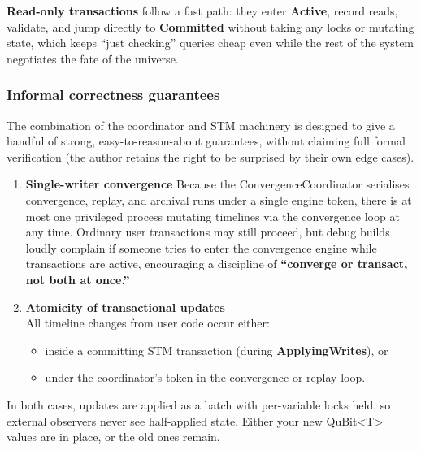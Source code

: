 \documentclass[a4paper,11pt]{article}
\begin{document}
\textbf{Read-only transactions} follow a fast path: they enter \textbf{Active}, record reads, validate, and jump directly to \textbf{Committed} without taking any locks or mutating state, which keeps ``just checking'' queries cheap even while the rest of the system negotiates the fate of the universe.

\subsubsection{Informal correctness guarantees}

The combination of the coordinator and STM machinery is designed to give a handful of strong, easy-to-reason-about guarantees, without claiming full formal verification (the author retains the right to be surprised by their own edge cases).

\begin{enumerate}
\def\labelenumi{\arabic{enumi}.}
\item
  \textbf{Single-writer convergence}
  Because the ConvergenceCoordinator serialises convergence, replay, and archival runs under a single engine token, there is at most one privileged process mutating timelines via the convergence loop at any time. Ordinary user transactions may still proceed, but debug builds loudly complain if someone tries to enter the convergence engine while transactions are active, encouraging a discipline of \textbf{``converge or transact, not both at once.''}
\item
  \textbf{Atomicity of transactional updates}\\
  All timeline changes from user code occur either:

  \begin{itemize}
  \item
    inside a committing STM transaction (during \textbf{ApplyingWrites}), or
  \item
    under the coordinator's token in the convergence or replay loop.
  \end{itemize}
\end{enumerate}

In both cases, updates are applied as a batch with per-variable locks held, so external observers never see half-applied state. Either your new QuBit\textless T\textgreater{} values are in place, or the old ones remain.
\end{document}
